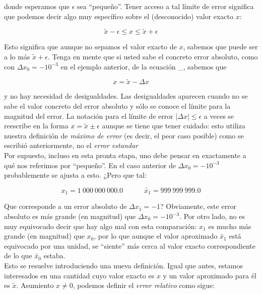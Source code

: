 \documentclass[11pt]{article}
\begin{document}
donde esperamos que \(\epsilon\) sea ``pequeño''. Tener acceso a tal
límite de error significa que podemos decir algo muy específico sobre el
(desconocido) valor exacto \(x\):

\[
\begin{equation}
\tilde{x} - \epsilon \leq x \leq \tilde{x} + \epsilon \label{2.9}\tag{6}
\end{equation}
\]

Esto significa que aunque no sepamos el valor exacto de \(x\), sabemos
que puede ser a lo más \(\tilde{x} + \epsilon\). Tenga en mente que si
usted sabe el concreto error absoluto, como con
\(\Delta x_0 = -10^{-3}\) en el ejemplo anterior, de la ecuación \_,
sabemos que

\[
\begin{equation}
x = \tilde{x} - \Delta x \label{2.10} \tag{7}
\end{equation}
\]

y no hay necesidad de desigualdades. Las desigualdades aparecen cuando
no se sabe el valor concreto del error absoluto y sólo se conoce el
límite para la magnitud del error. La notación para el límite de error
\(|\Delta x| \leq \epsilon\) a veces se reescribe en la forma
\(x = \tilde{x} \pm \epsilon\) aunque se tiene que tener cuidado: esto
utiliza nuestra definición de \emph{máximo de error} (es decir, el peor
caso posible) como se escribió anteriormente, no el \emph{error
estandar}\\
Por supuesto, incluso en esta pronta etapa, uno debe pensar en
exactamente a qué nos referimos por ``pequeño''. En el caso anterior de
\(\Delta x_0 = -10^{-3}\) probablemente se ajusta a esto. ¿Pero que tal:

\[
\begin{equation}
x_1 = 1 \ 000 \ 000 \ 000.0 \quad \quad \quad \tilde{x_1} = 999 \ 999 \ 999.0 \label{2.11}\tag{8}
\end{equation}
\]

Que corresponde a un error absoluto de \(\Delta x_1 = -1\)? Obviamente,
este error absoluto es más grande (en magnitud) que
\(\Delta x_0 = -10^{-3}\). Por otro lado, no es muy equivocado decir que
hay algo mal con esta comparación: \(x_1\) es mucho más grande (en
magnitud) que \(x_0\), por lo que aunque el valor aproximado
\(\tilde{x_1}\) está equivocado por una unidad, se ``siente'' más cerca
al valor exacto correspondiente de lo que \(\tilde{x_0}\) estaba.\\
Esto se resuelve introduciendo una nueva definición. Igual que antes,
estamos interesados en una cantidad cuyo valor exacto es \(x\) y un
valor aproximado para él es \(\tilde{x}\). Asumiento \(x \neq 0\),
podemos definir el \emph{error relativo} como sigue:
\end{document}
